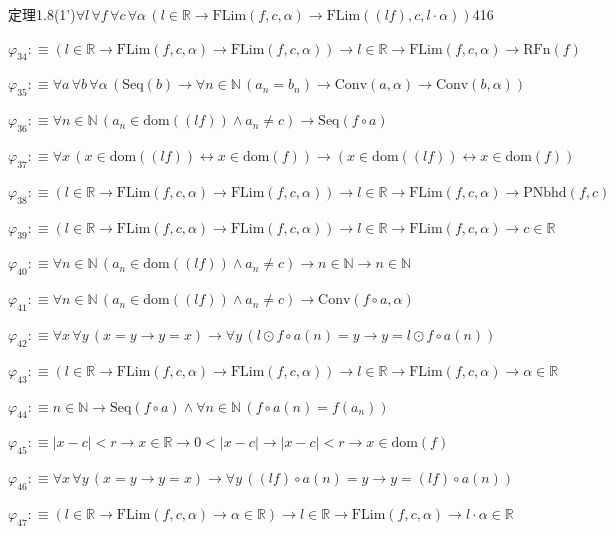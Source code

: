 \begin{fullproof}{定理1.8(1')}{$\forall l\,\forall f\,\forall c\,\forall \alpha\,(l \in \mathbb{R} \to \mathrm{FLim}(f,c,\alpha) \to \mathrm{FLim}((l f),c,l \cdot \alpha))$}{416}
\begin{abbrevlist}
\item $\varphi_{34} :\equiv (l \in \mathbb{R} \to \mathrm{FLim}(f,c,\alpha) \to \mathrm{FLim}(f,c,\alpha)) \to l \in \mathbb{R} \to \mathrm{FLim}(f,c,\alpha) \to \mathrm{RFn}(f)$
\item $\varphi_{35} :\equiv \forall a\,\forall b\,\forall \alpha\,(\mathrm{Seq}(b) \to \forall n \in \mathbb{N}\,(a_{n} = b_{n}) \to \mathrm{Conv}(a,\alpha) \to \mathrm{Conv}(b,\alpha))$
\item $\varphi_{36} :\equiv \forall n \in \mathbb{N}\,(a_{n} \in \mathrm{dom}((l f)) \land a_{n} \neq c) \to \mathrm{Seq}(f \circ a)$
\item $\varphi_{37} :\equiv \forall x\,(x \in \mathrm{dom}((l f)) \leftrightarrow x \in \mathrm{dom}(f)) \to (x \in \mathrm{dom}((l f)) \leftrightarrow x \in \mathrm{dom}(f))$
\item $\varphi_{38} :\equiv (l \in \mathbb{R} \to \mathrm{FLim}(f,c,\alpha) \to \mathrm{FLim}(f,c,\alpha)) \to l \in \mathbb{R} \to \mathrm{FLim}(f,c,\alpha) \to \mathrm{PNbhd}(f,c)$
\item $\varphi_{39} :\equiv (l \in \mathbb{R} \to \mathrm{FLim}(f,c,\alpha) \to \mathrm{FLim}(f,c,\alpha)) \to l \in \mathbb{R} \to \mathrm{FLim}(f,c,\alpha) \to c \in \mathbb{R}$
\item $\varphi_{40} :\equiv \forall n \in \mathbb{N}\,(a_{n} \in \mathrm{dom}((l f)) \land a_{n} \neq c) \to n \in \mathbb{N} \to n \in \mathbb{N}$
\item $\varphi_{41} :\equiv \forall n \in \mathbb{N}\,(a_{n} \in \mathrm{dom}((l f)) \land a_{n} \neq c) \to \mathrm{Conv}(f \circ a,\alpha)$
\item $\varphi_{42} :\equiv \forall x\,\forall y\,(x = y \to y = x) \to \forall y\,(l \odot f \circ a(n) = y \to y = l \odot f \circ a(n))$
\item $\varphi_{43} :\equiv (l \in \mathbb{R} \to \mathrm{FLim}(f,c,\alpha) \to \mathrm{FLim}(f,c,\alpha)) \to l \in \mathbb{R} \to \mathrm{FLim}(f,c,\alpha) \to \alpha \in \mathbb{R}$
\item $\varphi_{44} :\equiv n \in \mathbb{N} \to \mathrm{Seq}(f \circ a) \land \forall n \in \mathbb{N}\,(f \circ a(n) = f(a_{n}))$
\item $\varphi_{45} :\equiv \lvert x - c \rvert < r \to x \in \mathbb{R} \to 0 < \lvert x - c \rvert \to \lvert x - c \rvert < r \to x \in \mathrm{dom}(f)$
\item $\varphi_{46} :\equiv \forall x\,\forall y\,(x = y \to y = x) \to \forall y\,((l f) \circ a(n) = y \to y = (l f) \circ a(n))$
\item $\varphi_{47} :\equiv (l \in \mathbb{R} \to \mathrm{FLim}(f,c,\alpha) \to \alpha \in \mathbb{R}) \to l \in \mathbb{R} \to \mathrm{FLim}(f,c,\alpha) \to l \cdot \alpha \in \mathbb{R}$

\end{abbrevlist}
\end{fullproof}
